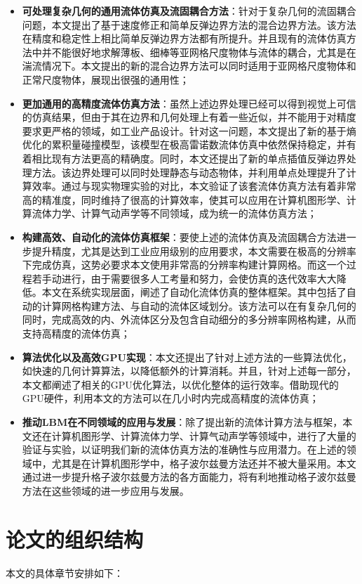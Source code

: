 \begin{itemize}
    \item \textbf{可处理复杂几何的通用流体仿真及流固耦合方法}：针对于复杂几何的流固耦合问题，本文提出了基于速度修正和简单反弹边界方法的混合边界方法。该方法在精度和稳定性上相比简单反弹边界方法都有所提升。并且现有的流体仿真方法中并不能很好地求解薄板、细棒等亚网格尺度物体与流体的耦合，尤其是在湍流情况下。本文提出的新的混合边界方法可以同时适用于亚网格尺度物体和正常尺度物体，展现出很强的通用性；
    \item \textbf{更加通用的高精度流体仿真方法}：虽然上述边界处理已经可以得到视觉上可信的仿真结果，但由于其在边界和几何处理上有着一些近似，并不能用于对精度要求更严格的领域，如工业产品设计。针对这一问题，本文提出了新的基于熵优化的累积量碰撞模型，该模型在极高雷诺数流体仿真中依然保持稳定，并有着相比现有方法更高的精确度。同时，本文还提出了新的单点插值反弹边界处理方法。该边界处理可以同时处理静态与动态物体，并利用单点处理提升了计算效率。通过与现实物理实验的对比，本文验证了该套流体仿真方法有着非常高的精准度，同时维持了很高的计算效率，使其可以应用在计算机图形学、计算流体力学、计算气动声学等不同领域，成为统一的流体仿真方法；
    \item \textbf{构建高效、自动化的流体仿真框架}：要使上述的流体仿真及流固耦合方法进一步提升精度，尤其是达到工业应用级别的应用要求，本文需要在极高的分辨率下完成仿真，这势必要求本文使用非常高的分辨率构建计算网格。而这一个过程若手动进行，由于需要很多人工考量和努力，会使仿真的迭代效率大大降低。本文在系统实现层面，阐述了自动化流体仿真的整体框架。其中包括了自动的计算网格构建方法、与自动的流体区域划分。该方法可以在有复杂几何的同时，完成高效的内、外流体区分及包含自动细分的多分辨率网格构建，从而支持高精度的流体仿真；
    \item \textbf{算法优化以及高效GPU实现}：本文还提出了针对上述方法的一些算法优化，如快速的几何计算算法，以降低额外的计算消耗。并且，针对上述每一部分，本文都阐述了相关的GPU优化算法，以优化整体的运行效率。借助现代的GPU硬件，利用本文的方法可以在几小时内完成高精度的流体仿真；
    \item \textbf{推动LBM在不同领域的应用与发展}：除了提出新的流体计算方法与框架，本文还在计算机图形学、计算流体力学、计算气动声学等领域中，进行了大量的验证与实验，以证明我们新的流体仿真方法的准确性与应用潜力。在上述的领域中，尤其是在计算机图形学中，格子波尔兹曼方法还并不被大量采用。本文通过进一步提升格子波尔兹曼方法的各方面能力，将有利地推动格子波尔兹曼方法在这些领域的进一步应用与发展。
\end{itemize}

\section{论文的组织结构}
本文的具体章节安排如下：

